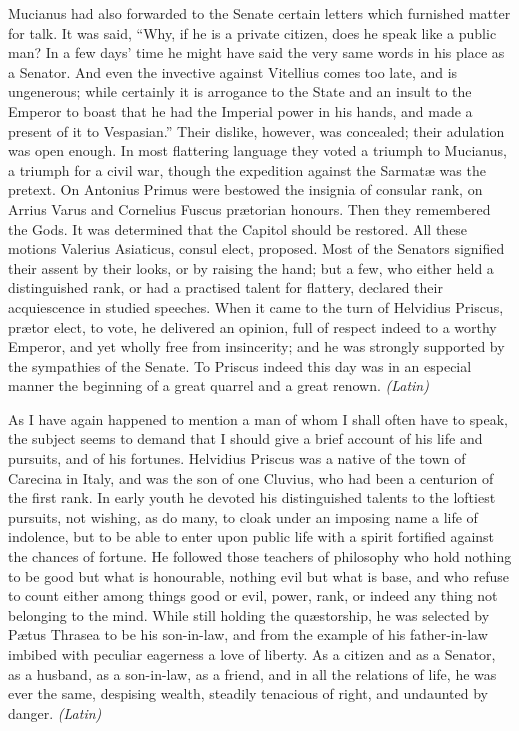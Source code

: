 Mucianus had also forwarded to the Senate certain letters which furnished matter for talk. It was said, ``Why, if he is a private citizen, does he speak like a public man? In a few days' time he might have said the very same words in his place as a Senator. And even the invective against Vitellius comes too late, and is ungenerous; while certainly it is arrogance to the State and an insult to the Emperor to boast that he had the Imperial power in his hands, and made a present of it to Vespasian.'' Their dislike, however, was concealed; their adulation was open enough. In most flattering language they voted a triumph to Mucianus, a triumph for a civil war, though the expedition against the Sarmatæ was the pretext. On Antonius Primus were bestowed the insignia of consular rank, on Arrius Varus and Cornelius Fuscus prætorian honours. Then they remembered the Gods. It was determined that the Capitol should be restored. All these motions Valerius Asiaticus, consul elect, proposed. Most of the Senators signified their assent by their looks, or by raising the hand; but a few, who either held a distinguished rank, or had a practised talent for flattery, declared their acquiescence in studied speeches. When it came to the turn of Helvidius Priscus, prætor elect, to vote, he delivered an opinion, full of respect indeed to a worthy Emperor, and yet wholly free from insincerity; and he was strongly supported by the sympathies of the Senate. To Priscus indeed this day was in an especial manner the beginning of a great quarrel and a great renown. \emph{(Latin)}


As I have again happened to mention a man of whom I shall often have to speak, the subject seems to demand that I should give a brief account of his life and pursuits, and of his fortunes. Helvidius Priscus was a native of the town of Carecina in Italy, and was the son of one Cluvius, who had been a centurion of the first rank. In early youth he devoted his distinguished talents to the loftiest pursuits, not wishing, as do many, to cloak under an imposing name a life of indolence, but to be able to enter upon public life with a spirit fortified against the chances of fortune. He followed those teachers of philosophy who hold nothing to be good but what is honourable, nothing evil but what is base, and who refuse to count either among things good or evil, power, rank, or indeed any thing not belonging to the mind. While still holding the quæstorship, he was selected by Pætus Thrasea to be his son-in-law, and from the example of his father-in-law imbibed with peculiar eagerness a love of liberty. As a citizen and as a Senator, as a husband, as a son-in-law, as a friend, and in all the relations of life, he was ever the same, despising wealth, steadily tenacious of right, and undaunted by danger. \emph{(Latin)}

